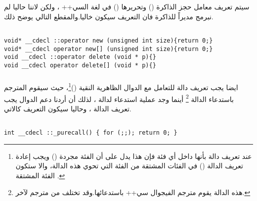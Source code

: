 \documentclass[document.tex]{subfiles}
\begin{document}
سيتم تعريف معامل حجز الذاكرة  () وتحريرها () في لغة السي++ ، ولكن لاننا حاليا لم نبرمج مديراً للذاكرة فان التعريف سيكون خاليا.والمقطع التالي يوضح ذلك.
\begin{english}

\lstset{numberstyle=\tiny,numbersep=5pt,tabsize=2,extendedchars=true,breaklines=true,frame=b,showspaces=false, showtabs=false,xleftmargin=10pt,framexleftmargin=10pt,framexrightmargin=5pt,framexbottommargin=4pt,showstringspaces=false,language=C++}



\begin{lstlisting}[label=newdelete,caption=Global new/delete operator]

void* __cdecl ::operator new (unsigned int size){return 0;}
void* __cdecl operator new[] (unsigned int size){return 0;}
void __cdecl ::operator delete (void * p){}
void __cdecl operator delete[] (void * p){}

\end{lstlisting}
\end{english}

\subsubsection{}
ايضا يجب تعريف دالة للتعامل مع الدوال الظاهرية النقية ()\footnote{عند تعريف دالة بأنها  داخل أي فئة فإن هذا يدل على أن الفئة مجردة () ويجب إعادة تعريف الدالة () في الفئات المشتقة من الفئة التي تحوي هذه الدالة، والا ستكون الفئة المشتقة .}، حيث سيقوم المترجم باستدعاء الدالة \footnote{هذه الدالة يقوم مترجم الفيجوال سي++ باستدعائها.وقد تختلف من مترجم لآخر.} أينما وجد عملية استدعاء لدالة  ، لذلك أن أردنا دعم الدوال  يجب تعريف الدالة  ، وحاليا سيكون التعريف كالاتي.


\begin{english}

\lstset{numberstyle=\tiny,numbersep=5pt,tabsize=2,extendedchars=true,breaklines=true,frame=b,showspaces=false, showtabs=false,xleftmargin=10pt,framexleftmargin=10pt,framexrightmargin=5pt,framexbottommargin=4pt,showstringspaces=false,language=C++}


\begin{lstlisting}[label=newdelete,caption=Global new/delete operator]

int __cdecl ::_purecall() { for (;;); return 0; }

\end{lstlisting}
\end{english}
\end{document}
